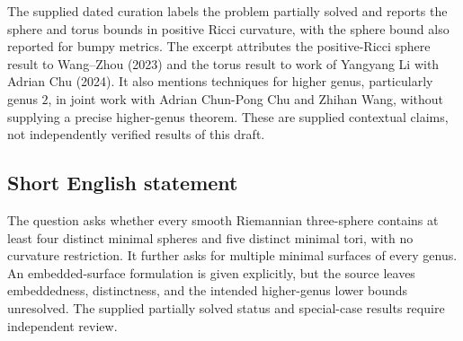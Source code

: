 \documentclass[11pt]{article}
\begin{document}
The supplied dated curation labels the problem partially solved and reports the sphere and torus bounds in positive Ricci curvature, with the sphere bound also reported for bumpy metrics. The excerpt attributes the positive-Ricci sphere result to Wang--Zhou (2023) and the torus result to work of Yangyang Li with Adrian Chu (2024). It also mentions techniques for higher genus, particularly genus \(2\), in joint work with Adrian Chun-Pong Chu and Zhihan Wang, without supplying a precise higher-genus theorem. These are supplied contextual claims, not independently verified results of this draft.
\subsection{Short English statement}
The question asks whether every smooth Riemannian three-sphere contains at least four distinct minimal spheres and five distinct minimal tori, with no curvature restriction. It further asks for multiple minimal surfaces of every genus. An embedded-surface formulation is given explicitly, but the source leaves embeddedness, distinctness, and the intended higher-genus lower bounds unresolved. The supplied partially solved status and special-case results require independent review.
\end{document}
